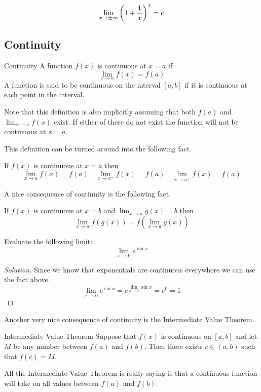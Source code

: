 \begin{equation}
\lim_{x\to \pm\infty} \left(1+\frac{1}{x}\right)^x=e
\end{equation}
\pagebreak

\subsection{Continuity}
\begin{defn}{Continuity}{}
A function $f(x)$ is continuous at $x=a$ if 
\[ \lim_{x\to a} f(x)=f(a) \]
A function is said to be continuous on the interval  $[a,b]$ if it is continuous at each point in the interval.
\end{defn}
Note that this definition is also implicitly assuming that both $f(a)$ and $\lim_{x\to a}f(x)$ exist. If either of these do not exist the function will not be continuous at $x=a$.

This definition can be turned around into the following fact.
\begin{corollary}
If $f(x)$ is continuous at $x=a$ then
\[ \lim_{x \to a} f(x) = f(a) \quad \lim_{x \to a^-} f(x) = f(a) \quad \lim_{x \to a^+} f(x) = f(a) \]
\end{corollary}

A nice consequence of continuity is the following fact.
\begin{corollary}
If $f(x)$ is continuous at $x=b$ and $\lim_{x\to a}g(x)=b$ then
\[ \lim_{x \to a} f(g(x)) = f(\lim_{x \to a} g(x)) \]
\end{corollary}

\begin{exmp}{}{}
Evaluate the following limit:
\[ \lim_{x \to 0} e^{\sin x} \]
\end{exmp}

\begin{proof}[Solution]
Since we know that exponentials are continuous everywhere we can use the fact above.
\[ \lim_{x \to 0} e^{\sin x} = e^{\lim_{x \to 0} \sin x} = e^0 = \boxed{1} \]
\end{proof}

Another very nice consequence of continuity is the Intermediate Value Theorem.
\begin{thrm}{Intermediate Value Theorem}{}
Suppose that $f(x)$ is continuous on $[a,b]$ and let $M$ be any number between $f(a)$ and $f(b)$. Then there exists $c \in (a,b)$ such that $f(c)=M$.
\end{thrm}
All the Intermediate Value Theorem is really saying is that a continuous function will take on all values between $f(a)$ and $f(b)$.
\pagebreak

